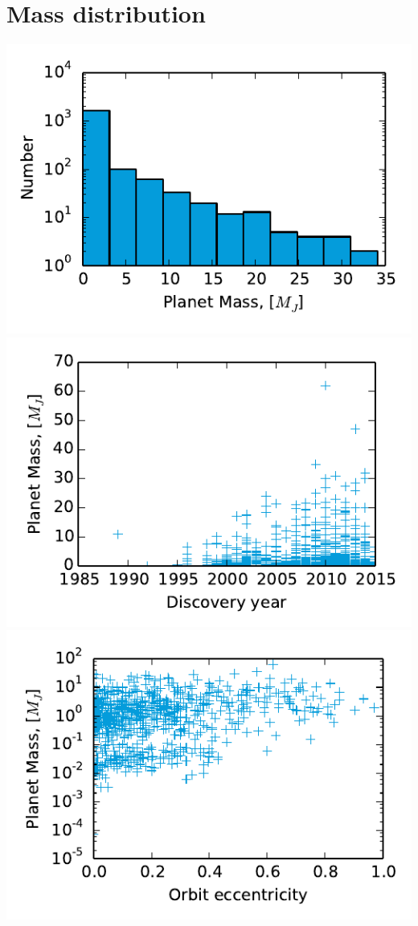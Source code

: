 \section{Mass distribution}
\label{sec:mass-distribution}
\includegraphics{figures/masshist.pdf}
\includegraphics{figures/massyear.pdf}
\includegraphics{figures/eccmass.pdf}
